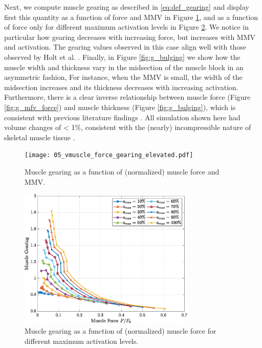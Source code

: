 \documentclass{sfuthesis}
\numberwithin{equation}{section}
\numberwithin{figure}{chapter}
\numberwithin{table}{chapter}
\theoremstyle{definition}
\begin{document}
Next, we compute muscle gearing as described in \eqref{eq:def_gearing} and display first this quantity as a function of force and MMV in Figure \ref{fig:g_elevated}, and as a function of force only for different maximum activation levels in Figure \ref{fig:g_gearing_v_force}. We notice in particular how gearing decreases with increasing force, but increases with MMV and activation. The gearing values observed in this case align well with those observed by Holt et al. \cite{Holt2016}. Finally, in Figure \ref{fig:g_bulging} we show how the muscle width and thickness vary in the midsection of the muscle block in an asymmetric fashion, For instance, when the MMV is small, the width of the midsection increases and its thickness decreases with increasing activation. Furthermore, there is a clear inverse relationship between muscle force (Figure \ref{fig:g_mfv_force}) and muscle thickness (Figure \ref{fig:g_bulging}), which is consistent with previous literature findings \cite{Azizi2008VariableGearing}. All simulation shown here had volume changes of < 1\%, consistent with the (nearly) incompressible nature of skeletal muscle tissue \cite{BaskinPaolini}.

\begin{figure}
    \centering
    \texttt{[image: 05\_vmuscle\_force\_gearing\_elevated.pdf]}
    \caption{Muscle gearing as a function of (normalized) muscle force and MMV.
    \label{fig:g_elevated}}
\end{figure}

\begin{figure}
    \centering
    \includegraphics[width=0.75\textwidth]{07_force_gearing.eps}
    \caption{Muscle gearing as a function of (normalized) muscle force for different maximum activation levels.
    \label{fig:g_gearing_v_force}}
\end{figure}
\end{document}
